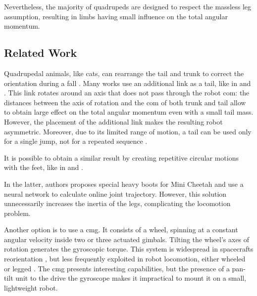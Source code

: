\documentclass[journal,letterpaper]{IEEEtran}
\begin{document}
Nevertheless, the majority of quadrupeds are designed to respect the massless leg assumption, resulting in limbs having small influence on the total angular momentum.


\subsection{Related Work}
Quadrupedal animals, like cats, can rearrange the tail and trunk to correct the orientation during a fall \cite{kane1969dynamical}.
Many works use an additional link as a tail, like in \cite{chu2019null} and \cite{wenger2016frontal}.
This link rotates around an axis that does not pass through the robot \acrshort{com}: the distances between the axis of rotation and the \acrshort{com} of both trunk and tail allow to obtain large effect on the total angular momentum even with a small tail mass.
However, the placement of the additional link makes the resulting robot asymmetric. Moreover, due to its limited range of motion, a tail can be used only for a single jump, not for a repeated sequence \cite{johnson2012tail}.

It is possible to obtain a similar result by creating repetitive circular motions with the feet, like in \cite{hoffman2021exploiting} and \cite{kurtz2021mini}.

In the latter, authors proposes special heavy boots for Mini Cheetah and use a neural network to calculate online joint trajectory. However, this solution unnecessarily increases the inertia of the legs, complicating the locomotion problem. 

Another option is to use a \acrfull{cmg}.
It consists of a wheel, spinning at a constant angular velocity inside two or three actuated gimbals.
Tilting the wheel's axes of rotation generates the gyroscopic torque.
This system is widespread in spacecrafts reorientation \cite{yoon2002spacecraft}, but less frequently exploited in robot locomotion, either wheeled \cite{brown1996single} or legged \cite{mikhalkov2021gyrubot}.
The \acrshort{cmg} presents interesting capabilities, but the presence of a pan-tilt  unit to the drive the gyroscope makes it impractical to mount it on a small, lightweight robot.
\end{document}
